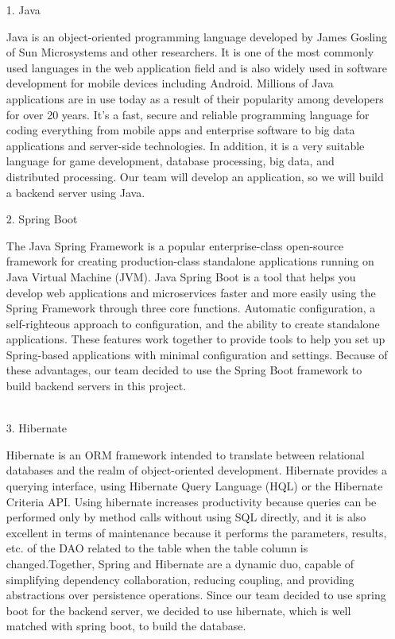 \documentclass[conference]{IEEEtran}
\begin{document}
\begin{enumerate}
    \begin{enumerate}
        \item[1.]Java
        \item[]Java is an object-oriented programming language developed by James Gosling of Sun Microsystems and other researchers. It is one of the most commonly used languages in the web application field and is also widely used in software development for mobile devices including Android. Millions of Java applications are in use today as a result of their popularity among developers for over 20 years. It's a fast, secure and reliable programming language for coding everything from mobile apps and enterprise software to big data applications and server-side technologies. In addition, it is a very suitable language for game development, database processing, big data, and distributed processing. Our team will develop an application, so we will build a backend server using Java.\\

        \item[2.]Spring Boot 
        \item[]The Java Spring Framework is a popular enterprise-class open-source framework for creating production-class standalone applications running on Java Virtual Machine (JVM). Java Spring Boot is a tool that helps you develop web applications and microservices faster and more easily using the Spring Framework through three core functions. Automatic configuration, a self-righteous approach to configuration, and the ability to create standalone applications. These features work together to provide tools to help you set up Spring-based applications with minimal configuration and settings. Because of these advantages, our team decided to use the Spring Boot framework to build backend servers in this project.\\ \\

        \item[3.]Hibernate \cite{fisher2010spring}
        \item[]Hibernate is an ORM framework intended to translate between relational databases and the realm of object-oriented development. Hibernate provides a querying interface, using Hibernate Query Language (HQL) or the Hibernate Criteria API. Using hibernate increases productivity because queries can be performed only by method calls without using SQL directly, and it is also excellent in terms of maintenance because it performs the parameters, results, etc. of the DAO related to the table when the table column is changed.Together, Spring and Hibernate are a dynamic duo, capable of simplifying dependency collaboration, reducing coupling, and providing abstractions over persistence operations. Since our team decided to use spring boot for the backend server, we decided to use hibernate, which is well matched with spring boot, to build the database.\\


\end{enumerate}
\end{enumerate}
\end{document}
